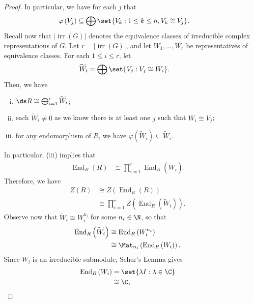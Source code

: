 \documentclass[10pt]{mypackage}
\begin{document}
\begin{proof}
  In particular, we have for each $j$ that
  \begin{align*}
    \varphi\left( V_j \right) &\subseteq \bigoplus\set{V_k : 1\leq k \leq n,V_k\cong V_j}.
  \end{align*}
  Recall now that $\left\vert \operatorname{irr}\left( G \right) \right\vert$ denotes the equivalence classes of irreducible complex representations of $G$. Let $r = \left\vert \operatorname{irr}\left( G \right) \right\vert$, and let $W_1,\dots,W_r$ be representatives of equivalence classes. For each $1\leq i \leq r$, let
  \begin{align*}
    \widetilde{W}_i &= \bigoplus\set{V_j : V_j\cong W_i}.
  \end{align*}
  Then, we have
  \begin{enumerate}[(i)]
    \item $\ds R \cong \bigoplus_{i=1}^{r} \widetilde{W}_i$;
    \item each $ \widetilde{W}_i\neq 0 $ as we know there is at least one $j$ such that $W_i\cong V_j$;
    \item for any endomorphism of $R$, we have $\varphi\left( \widetilde{W}_i \right)\subseteq \widetilde{W}_i$.
  \end{enumerate}
  In particular, (iii) implies that
  \begin{align*}
    \operatorname{End}_R(R) &\cong \prod_{i=1}^{r} \operatorname{End}_R\left( \widetilde{W}_i \right).
  \end{align*}
  Therefore, we have
  \begin{align*}
    Z\left( R \right) &\cong Z\left( \operatorname{End}_R(R) \right)\\
                      &\cong \prod_{i=1}^{r} Z\left( \operatorname{End}_R\left( \widetilde{W}_i \right) \right).
  \end{align*}
  Observe now that $ \widetilde{W}_i\cong W_i^{n_i} $ for some $n_i\in \N$, so that
  \begin{align*}
    \operatorname{End}_R\left( \widetilde{W}_i \right) &\cong \operatorname{End}_R\left( W_i^{n_i} \right)\\
                                                       &\cong \Mat_{n_i}\left( \operatorname{End}_R\left( W_i \right) \right).
  \end{align*}
  Since $W_i$ is an irreducible submodule, Schur's Lemma gives
  \begin{align*}
    \operatorname{End}_R\left( W_i \right) &= \set{\lambda I : \lambda\in \C}\\
                                           &\cong \C,

\end{align*}
\end{proof}
\end{document}
